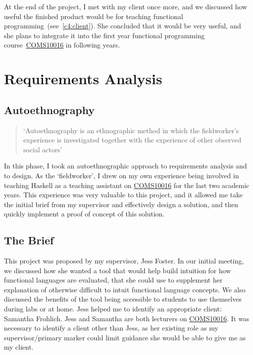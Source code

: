 At the end of the project, I met with my client once more, and we discussed how useful the finished product would be for teaching functional programming~(see~\ref{c4:client}). She concluded that it would be very useful, and she plans to integrate it into the first year functional programming course~\hyperref[COMS10016]{COMS10016} in following years. 

\section{Requirements Analysis}
\subsection{Autoethnography}
\label{sec:c1_autoethnography}
\begin{quote}
`Autoethnography is an ethnographic method in which the fieldworker's experience is investigated together with the experience of other observed social actors'~\cite{autoethnography}
\end{quote}

\noindent In this phase, I took an autoethnographic approach to requirements analysis and to design. As the `fieldworker', I drew on my own experience being involved in teaching Haskell as a teaching assistant on \hyperref[COMS10016]{COMS10016} for the last two academic years. This experience was very valuable to this project, and it allowed me take the initial brief from my supervisor and effectively design a solution, and then quickly implement a proof of concept of this solution. 

\subsection{The Brief}
This project was proposed by my supervisor, Jess Foster. In our initial meeting, we discussed how she wanted a tool that would help build intuition for how functional languages are evaluated, that she could use to supplement her explanation of otherwise difficult to intuit functional language concepts. We also discussed the benefits of the tool being accessible to students to use themselves during labs or at home. Jess helped me to identify an appropriate client: Samantha Frohlich. Jess and Samantha are both lecturers on \hyperref[COMS10016]{COMS10016}. It was necessary to identify a client other than Jess, as her existing role as my supervisor/primary marker could limit guidance she would be able to give me as my client. 

